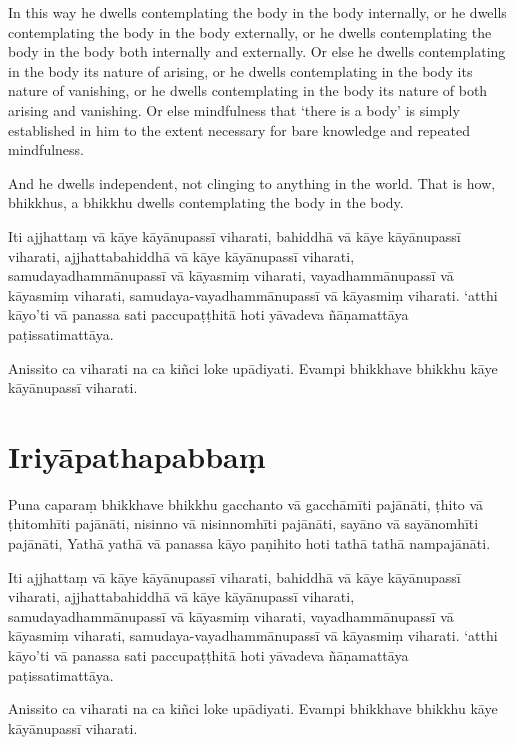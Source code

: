 In this way he dwells contemplating the body in the body internally, or he
dwells contemplating the body in the body externally, or he dwells contemplating
the body in the body both internally and externally. Or else he dwells
contemplating in the body its nature of arising, or he dwells contemplating in
the body its nature of vanishing, or he dwells contemplating in the body its
nature of both arising and vanishing. Or else mindfulness that ‘there is a body’
is simply established in him to the extent necessary for bare knowledge and
repeated mindfulness.

And he dwells independent, not clinging to anything in the world. That is how,
bhikkhus, a bhikkhu dwells contemplating the body in the body.


\paliPage

Iti ajjhattaṃ vā kāye kāyānupassī viharati, bahiddhā vā kāye kāyānupassī
viharati, ajjhattabahiddhā vā kāye kāyānupassī viharati, samudayadhammānupassī
vā kāyasmiṃ viharati, vayadhammānupassī vā kāyasmiṃ viharati,
samudaya-vayadhammānupassī vā kāyasmiṃ viharati. `atthi kāyo'ti vā panassa sati
paccupaṭṭhitā hoti yāvadeva ñāṇamattāya paṭissatimattāya.

Anissito ca viharati na ca kiñci loke upādiyati. Evampi bhikkhave bhikkhu kāye
kāyānupassī viharati.


\section*{Iriyāpathapabbaṃ}

Puna caparaṃ bhikkhave bhikkhu gacchanto vā gacchāmīti pajānāti, ṭhito vā
ṭhitomhīti pajānāti, nisinno vā nisinnomhīti pajānāti, sayāno vā sayānomhīti
pajānāti, Yathā yathā vā panassa kāyo paṇihito hoti tathā tathā nampajānāti.

Iti ajjhattaṃ vā kāye kāyānupassī viharati, bahiddhā vā kāye kāyānupassī
viharati, ajjhattabahiddhā vā kāye kāyānupassī viharati, samudayadhammānupassī
vā kāyasmiṃ viharati, vayadhammānupassī vā kāyasmiṃ viharati,
samudaya-vayadhammānupassī vā kāyasmiṃ viharati. `atthi kāyo'ti vā panassa sati
paccupaṭṭhitā hoti yāvadeva ñāṇamattāya paṭissatimattāya.

Anissito ca viharati na ca kiñci loke upādiyati. Evampi bhikkhave bhikkhu kāye
kāyānupassī viharati.



